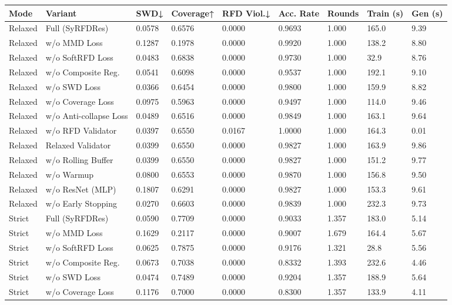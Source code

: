 \begin{tabular}{lllllllll}
\toprule
Mode & Variant & SWD↓ & Coverage↑ & RFD Viol.↓ & Acc. Rate & Rounds & Train (s) & Gen (s) \\
\midrule
Relaxed & Full (SyRFDRes) & 0.0578 & 0.6576 & 0.0000 & 0.9693 & 1.000 & 165.0 & 9.39 \\
Relaxed & w/o MMD Loss & 0.1287 & 0.1978 & 0.0000 & 0.9920 & 1.000 & 138.2 & 8.80 \\
Relaxed & w/o SoftRFD Loss & 0.0483 & 0.6838 & 0.0000 & 0.9730 & 1.000 & 32.9 & 8.76 \\
Relaxed & w/o Composite Reg. & 0.0541 & 0.6098 & 0.0000 & 0.9537 & 1.000 & 192.1 & 9.10 \\
Relaxed & w/o SWD Loss & 0.0366 & 0.6454 & 0.0000 & 0.9800 & 1.000 & 159.9 & 8.82 \\
Relaxed & w/o Coverage Loss & 0.0975 & 0.5963 & 0.0000 & 0.9497 & 1.000 & 114.0 & 9.46 \\
Relaxed & w/o Anti-collapse Loss & 0.0489 & 0.6516 & 0.0000 & 0.9849 & 1.000 & 163.1 & 9.64 \\
Relaxed & w/o RFD Validator & 0.0397 & 0.6550 & 0.0167 & 1.0000 & 1.000 & 164.3 & 0.01 \\
Relaxed & Relaxed Validator & 0.0399 & 0.6550 & 0.0000 & 0.9827 & 1.000 & 163.9 & 9.86 \\
Relaxed & w/o Rolling Buffer & 0.0399 & 0.6550 & 0.0000 & 0.9827 & 1.000 & 151.2 & 9.77 \\
Relaxed & w/o Warmup & 0.0800 & 0.6553 & 0.0000 & 0.9870 & 1.000 & 156.8 & 9.50 \\
Relaxed & w/o ResNet (MLP) & 0.1807 & 0.6291 & 0.0000 & 0.9827 & 1.000 & 153.3 & 9.61 \\
Relaxed & w/o Early Stopping & 0.0270 & 0.6603 & 0.0000 & 0.9839 & 1.000 & 232.3 & 9.73 \\
Strict & Full (SyRFDRes) & 0.0590 & 0.7709 & 0.0000 & 0.9033 & 1.357 & 183.0 & 5.14 \\
Strict & w/o MMD Loss & 0.1629 & 0.2117 & 0.0000 & 0.9007 & 1.679 & 164.4 & 5.67 \\
Strict & w/o SoftRFD Loss & 0.0625 & 0.7875 & 0.0000 & 0.9176 & 1.321 & 28.8 & 5.56 \\
Strict & w/o Composite Reg. & 0.0673 & 0.7038 & 0.0000 & 0.8332 & 1.393 & 232.6 & 4.46 \\
Strict & w/o SWD Loss & 0.0474 & 0.7489 & 0.0000 & 0.9204 & 1.357 & 188.9 & 5.64 \\
Strict & w/o Coverage Loss & 0.1176 & 0.7000 & 0.0000 & 0.8300 & 1.357 & 133.9 & 4.11 \\

\end{tabular}
